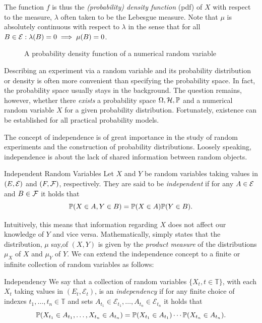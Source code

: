 The function \(f\) is thus the \textit{(probability) density function} (pdf) of \(X\) with respect to the measure, \(\lambda\) often taken to be the Lebesgue measure. Note that \(\mu\) is absolutely continuous with respect to \(\lambda\) in the sense that for all \(B \in \mathcal{E}: \lambda(B) = 0 \implies \mu(B) = 0\).
\begin{figure}[H]
	\centering
	
	\caption{A probability density function of a numerical random variable}
	\label{fig:ProbabilityDensityFunction}
\end{figure}

Describing an experiment via a random variable and its probability distribution or density is often more convenient than specifying the probability space. In fact, the probability space usually stays in the background. The question remains, however, whether there \textit{exists} a probability space \(\Omega, \mathcal{H}, \mathbb{P}\) and a numerical random variable \(X\) for a given probability distribution. Fortunately, existence can be established for all practical probability models.

The concept of independence is of great importance in the study of random experiments and the construction of probability distributions. Loosely speaking, independence is about the lack of shared information between random objects.

\begin{defn}{Independent Random Variables}{}
	Let $X$ and $Y$ be random variables taking values in $(E, \mathcal{E})$ and $(F, \mathcal{F})$, respectively. They are said to be \textit{independent} if for any $A \in \mathcal{E}$ and $B \in \mathcal{F}$ it holds that
	\begin{equation}
		\mathbb{P}(X \in A, Y \in B) = \mathbb{P}(X \in A) \mathbb{P}(Y \in B).
		\label{eq:IndependentRandomVariablesDef}
	\end{equation}
\end{defn}

Intuitively, this means that information regarding \(X\) does not affect our knowledge of \(Y\) and vice versa. Mathematically,  simply states that the distribution, \(\mu\) say,of \((X,Y)\) is given by the \textit{product measure} of the distributions \(\mu_X\) of \(X\) and \(\mu_Y\) of \(Y\). We can extend the independence concept to a finite or infinite collection of random variables as follows:

\begin{defn}{Independency}{}
	We say that a collection of random variables $\{X_t, t \in \mathbb{T}\}$, with each $X_t$ taking values in $(E_t, \mathcal{E}_t)$, is an \textit{independency} if for any finite choice of indexes $t_1, \dots, t_n \in \mathbb{T}$ and sets $A_{t_1} \in \mathcal{E}_{t_1}, \dots, A_{t_n} \in \mathcal{E}_{t_n}$ it holds that
	\begin{equation*}
		\mathbb{P}(X_{t_1} \in A_{t_1}, \dots, X_{t_n} \in A_{t_n}) = \mathbb{P}(X_{t_1} \in A_{t_1}) \cdots \mathbb{P}(X_{t_n} \in A_{t_n}).
	\end{equation*}
\end{defn}

